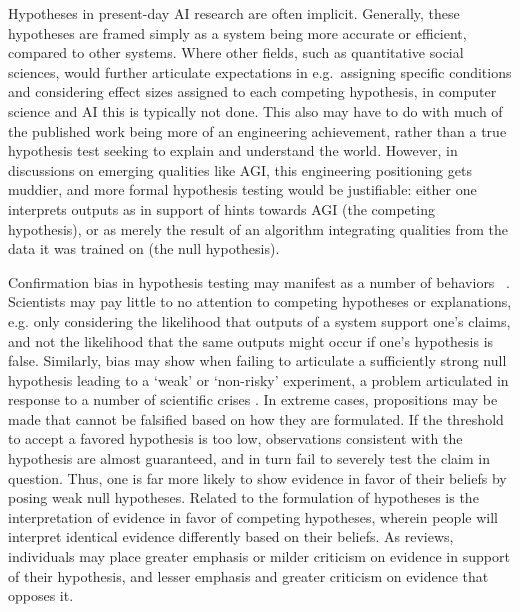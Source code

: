 \documentclass{article}
\theoremstyle{plain}
\theoremstyle{definition}
\theoremstyle{remark}
\begin{document}
Hypotheses in present-day AI research are often implicit. Generally, these hypotheses are framed simply as a system being more accurate or efficient, compared to other systems. Where other fields, such as quantitative social sciences, would further articulate expectations in e.g.\ assigning specific conditions and considering effect sizes assigned to each competing hypothesis, in computer science and AI this is typically not done. This also may have to do with much of the published work being more of an engineering achievement, rather than a true hypothesis test seeking to explain and understand the world. %
However, in discussions on emerging qualities like AGI, this engineering positioning gets muddier, and more formal hypothesis testing would be justifiable: either one interprets outputs as in support of hints towards AGI (the competing hypothesis), or as merely the result of an algorithm integrating qualities from the data it was trained on (the null hypothesis). 

Confirmation bias in hypothesis testing may manifest as a number of behaviors~ \citet{nickerson1998confirmation}. Scientists may pay little to no attention to competing hypotheses or explanations, e.g. only considering the likelihood that outputs of a system support one's claims, and not the likelihood that the same outputs might occur if one's hypothesis is false. Similarly, bias may show when failing to articulate a sufficiently strong null hypothesis leading to a `weak' or `non-risky' experiment, a problem articulated in response to a number of scientific crises \cite{claesen2022severity}. In extreme cases, propositions may be made that cannot be falsified based on how they are formulated. If the threshold to accept a favored hypothesis is too low, observations consistent with the hypothesis are almost guaranteed, and in turn fail to severely test the claim in question. Thus, one is far more likely to show evidence in favor of their beliefs by posing weak null hypotheses. Related to the formulation of hypotheses is the interpretation of evidence in favor of competing hypotheses, wherein people will interpret identical evidence differently based on their beliefs. As \citet{nickerson1998confirmation} reviews, individuals may place greater emphasis or milder criticism on evidence in support of their hypothesis, and lesser emphasis and greater criticism on evidence that opposes it. 
\end{document}
